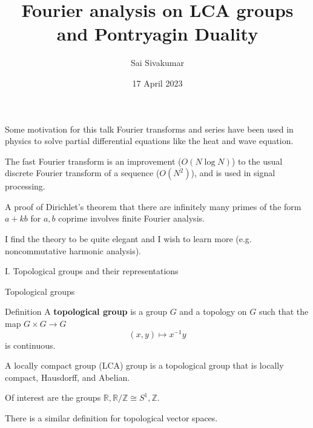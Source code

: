 \documentclass[mathserif
, handout
]{beamer}
\title
{\textcolor{black!85}{Fourier analysis on LCA groups and Pontryagin Duality}}
\author[Sai Sivakumar]{Sai Sivakumar}
\date{17 April 2023}
\begin{document}
\frame{\titlepage}

\begin{frame}{Some motivation for this talk}
    Fourier transforms and series have been used in physics to solve partial differential equations like the heat and wave equation. %
    \pause

    The fast Fourier transform is an improvement ($O(N\log N)$) to the usual discrete Fourier transform of a sequence ($O(N^2)$), and is used in signal processing. %
    \pause

    A proof of Dirichlet's theorem that there are infinitely many primes of the form $a+kb$ for $a,b$ coprime involves finite Fourier analysis.
    \pause

    I find the theory to be quite elegant and I wish to learn more (e.g. noncommutative harmonic analysis).
\end{frame}

\begin{frame}{}
    \begin{block}{}{
        \begin{center}\Large I. Topological groups and their representations\end{center}}
    \end{block}
\end{frame}

\begin{frame}{Topological groups}
    \begin{block}{Definition}
        A \textbf{topological group} is a group $G$ and a topology on $G$ such that the map $G\times G\to G$ \[(x,y)\mapsto x^{-1}y\] is continuous.
    \end{block} 
    \pause

    A locally compact group (LCA) group is a topological group that is locally compact, Hausdorff, and Abelian.
    \pause

    Of interest are the groups $\mathbb{R}, \mathbb{R}/\mathbb{Z}\cong S^1, \mathbb{Z}$.
    \pause

    There is a similar definition for topological vector spaces.
\end{frame}
\end{document}
